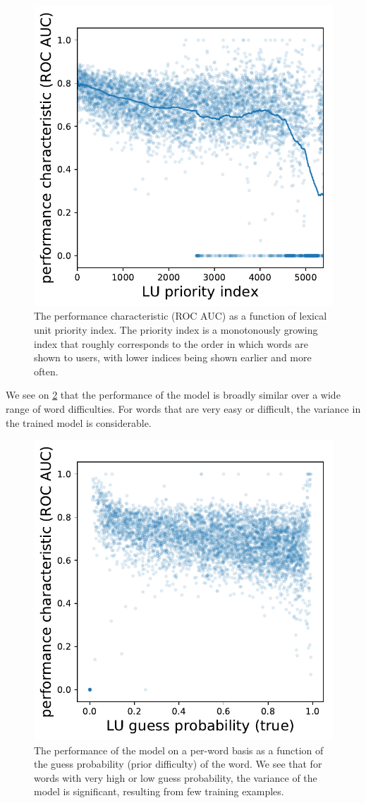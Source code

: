 \begin{figure}[ht]
\centering
\includegraphics[width=0.5\linewidth]{figures/lingvist/lu_roc_prio.pdf}
\caption{The performance characteristic (ROC AUC) as a function of lexical unit priority index. The priority index is a monotonously growing index that roughly corresponds to the order in which words are shown to users, with lower indices being shown earlier and more often.}
\label{fig:lu_roc_prio}
\end{figure}

We see on \cref{fig:lu_roc_guess_proba} that the performance of the model is broadly similar over a wide range of word difficulties. For words that are very easy or difficult, the variance in the trained model is considerable.

\begin{figure}[ht]
\centering
\includegraphics[width=0.5\linewidth]{figures/lingvist/lu_roc_guess_proba.pdf}
\caption{The performance of the model on a per-word basis as a function of the guess probability (prior difficulty) of the word. We see that for words with very high or low guess probability, the variance of the model is significant, resulting from few training examples.}
\label{fig:lu_roc_guess_proba}
\end{figure}

